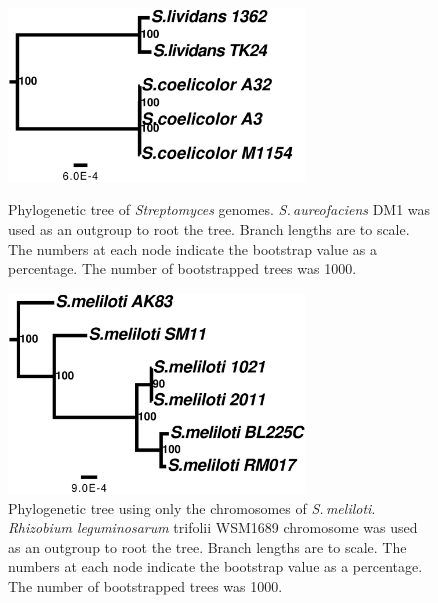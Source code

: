 \documentclass[11pt]{article}
\newcommand{\smel}{\textit{S.\,meliloti}\xspace}
\newcommand{\strep}{\textit{Streptomyces}\xspace}
\newcommand{\saur}{\textit{S.\,aureofaciens}\xspace}
\newcommand{\rleg}{\textit{Rhizobium leguminosarum}\xspace}
\begin{document}
\begin{figure}[H]
	\begin{center}
		\includegraphics[width=0.7\textwidth]{./figs/Strep_chrom_figtree_raw_11Sep20.pdf}
		\caption{\label{fig:streptree} Phylogenetic tree of \strep genomes. \saur DM1 was used as an outgroup to root the tree. Branch lengths are to scale. The numbers at each node indicate the bootstrap value as a percentage. The number of bootstrapped trees was 1000.}
	\end{center}
	\vspace*{\floatsep}%
	\begin{center}
		\includegraphics[width=0.7\textwidth]{./figs/SinoC_chrom_figtree_raw_11Sep20.pdf}
		\caption{\label{fig:sinoCtree} Phylogenetic tree using only the chromosomes of \smel. \rleg trifolii WSM1689 chromosome was used as an outgroup to root the tree. Branch lengths are to scale. The numbers at each node indicate the bootstrap value as a percentage. The number of bootstrapped trees was 1000.}
	\end{center}
\end{figure}
\end{document}
